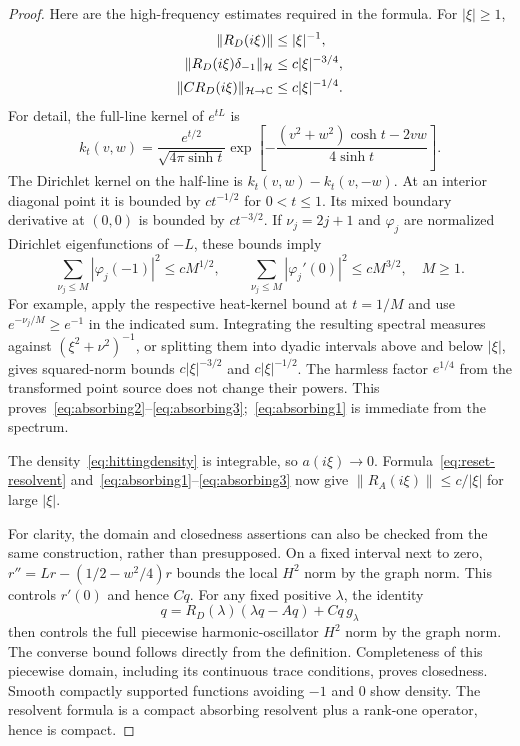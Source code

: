\documentclass[11pt,a4paper]{article}
\numberwithin{equation}{section}
\theoremstyle{remark}\newtheorem{remark}[theorem]{Remark}
\newcommand{\HH}{\mathcal H}\newcommand{\DD}{\mathcal D}
\begin{document}
\begin{proof}
Here are the high-frequency estimates required in the formula. For $|\xi|\geq1$,
\begin{align}
 \|R_D(i\xi)\|&\leq |\xi|^{-1},\label{eq:absorbing1}\\
 \|R_D(i\xi)\delta_{-1}\|_\HH&\leq c|\xi|^{-3/4},\label{eq:absorbing2}\\
 \|CR_D(i\xi)\|_{\HH\to\C}&\leq c|\xi|^{-1/4}.\label{eq:absorbing3}
\end{align}
For detail, the full-line kernel of $e^{tL}$ is
\[
 k_t(v,w)=\frac{e^{t/2}}{\sqrt{4\pi\sinh t}}
 \exp\left[-\frac{(v^2+w^2)\cosh t-2vw}{4\sinh t}\right].
\]
The Dirichlet kernel on the half-line is $k_t(v,w)-k_t(v,-w)$. At an interior diagonal point it is bounded by $ct^{-1/2}$ for $0<t\leq1$. Its mixed boundary derivative at $(0,0)$ is bounded by $ct^{-3/2}$. If $\nu_j=2j+1$ and $\varphi_j$ are normalized Dirichlet eigenfunctions of $-L$, these bounds imply
\[
 \sum_{\nu_j\leq M}|\varphi_j(-1)|^2\leq cM^{1/2},\qquad
 \sum_{\nu_j\leq M}|\varphi_j'(0)|^2\leq cM^{3/2},\quad M\geq1.
\]
For example, apply the respective heat-kernel bound at $t=1/M$ and use $e^{-\nu_j/M}\geq e^{-1}$ in the indicated sum. Integrating the resulting spectral measures against $(\xi^2+\nu^2)^{-1}$, or splitting them into dyadic intervals above and below $|\xi|$, gives squared-norm bounds $c|\xi|^{-3/2}$ and $c|\xi|^{-1/2}$. The harmless factor $e^{1/4}$ from the transformed point source does not change their powers. This proves~\eqref{eq:absorbing2}--\eqref{eq:absorbing3};~\eqref{eq:absorbing1} is immediate from the spectrum.

The density~\eqref{eq:hittingdensity} is integrable, so $a(i\xi)\to0$. Formula~\eqref{eq:reset-resolvent} and~\eqref{eq:absorbing1}--\eqref{eq:absorbing3} now give $\|R_A(i\xi)\|\leq c/|\xi|$ for large $|\xi|$.

For clarity, the domain and closedness assertions can also be checked from the same construction, rather than presupposed. On a fixed interval next to zero, $r''=Lr-(1/2-w^2/4)r$ bounds the local $H^2$ norm by the graph norm. This controls $r'(0)$ and hence $Cq$. For any fixed positive $\lambda$, the identity
\[
 q=R_D(\lambda)(\lambda q-Aq)+Cq\,g_\lambda
\]
then controls the full piecewise harmonic-oscillator $H^2$ norm by the graph norm. The converse bound follows directly from the definition. Completeness of this piecewise domain, including its continuous trace conditions, proves closedness. Smooth compactly supported functions avoiding $-1$ and $0$ show density. The resolvent formula is a compact absorbing resolvent plus a rank-one operator, hence is compact.


\end{proof}
\end{document}
